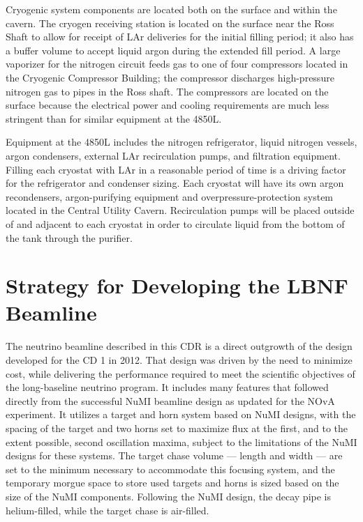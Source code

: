Cryogenic system components are located both on the surface and within the cavern. The cryogen receiving station is located on the surface near the Ross Shaft to allow for receipt of LAr deliveries for the initial filling period; it also has a buffer volume to accept liquid argon during the extended fill period. A large vaporizer for the nitrogen circuit feeds gas to one of four compressors located in the Cryogenic Compressor Building; the compressor discharges high-pressure nitrogen gas to pipes in the Ross shaft. The compressors are located on the surface because the electrical power  and cooling requirements are much less stringent  than for similar equipment at the 4850L.  
 
Equipment at the 4850L includes the nitrogen refrigerator, liquid nitrogen vessels, argon condensers, external LAr recirculation pumps, and filtration equipment. Filling each cryostat with LAr in a reasonable period of time is a driving factor for the refrigerator and condenser sizing.  Each cryostat will have its own argon recondensers, argon-purifying equipment and overpressure-protection system located in the Central Utility Cavern. Recirculation pumps will be placed outside of and adjacent to each cryostat in order to circulate liquid from the bottom of the tank through the purifier.
 
 
\section{Strategy for Developing the LBNF Beamline}
 
The neutrino beamline described in this CDR is a direct outgrowth of the design~\cite{lbnecdr} developed for the 
CD 1 in 2012.  That design was driven by the need to minimize cost, while delivering the performance required to meet the scientific objectives of the long-baseline neutrino program.  It includes many features that followed directly from the 
successful NuMI beamline design as updated for the NOvA experiment.  It utilizes a target and horn system based on NuMI designs, with the spacing of the target and two horns set to maximize flux at the first, and to the extent possible, second 
oscillation maxima, subject to the limitations of  the NuMI designs for these systems.  The target chase volume --- length and width --- are set to the minimum necessary to accommodate this focusing system, and the temporary morgue space to store 
used targets and horns is sized based on the size of the NuMI components.  Following the NuMI design, the decay pipe is helium-filled, while the target chase is air-filled.  
 
